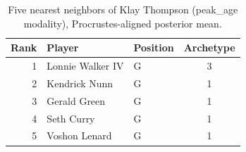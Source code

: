 \begin{table}[htbp]
  \centering\small
  \begin{tabular}{rllc}
    \toprule
    Rank & Player & Position & Archetype \\
    \midrule
    1 & Lonnie Walker IV & G & 3 \\
    2 & Kendrick Nunn & G & 1 \\
    3 & Gerald Green & G & 1 \\
    4 & Seth Curry & G & 1 \\
    5 & Voshon Lenard & G & 1 \\
    \bottomrule
  \end{tabular}
  \caption{Five nearest neighbors of Klay Thompson (peak_age modality), Procrustes-aligned posterior mean.}
  \label{tab:Klay_Thompson_neighbors_peak_age}
\end{table}

